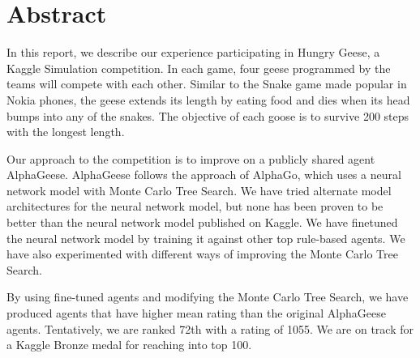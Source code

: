 \section{Abstract}

In this report, we describe our experience participating in Hungry Geese, a Kaggle Simulation competition. In each game, four geese programmed by the teams will compete with each other. Similar to the Snake game made popular in Nokia phones, the geese extends its length by eating food and dies when its head bumps into any of the snakes. The objective of each goose is to survive 200 steps with the longest length.

Our approach to the competition is to improve on a publicly shared agent AlphaGeese. AlphaGeese follows the approach of AlphaGo, which uses a neural network model with Monte Carlo Tree Search. We have tried alternate model architectures for the neural network model, but none has been proven to be better than the neural network model published on Kaggle. We have finetuned the neural network model by training it against other top rule-based agents. We have also experimented with different ways of improving the Monte Carlo Tree Search.

By using fine-tuned agents and modifying the Monte Carlo Tree Search, we have produced agents that have higher mean rating than the original AlphaGeese agents. Tentatively, we are ranked 72th with a rating of 1055. We are on track for a Kaggle Bronze medal for reaching into top 100.



